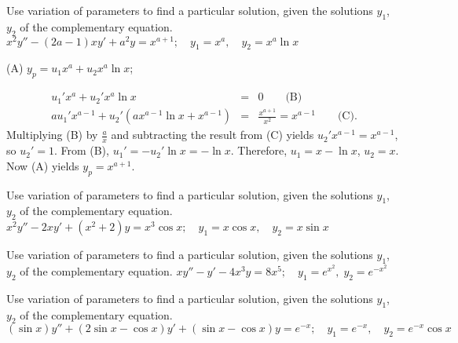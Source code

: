 \documentclass{ximera}
\begin{document}
\begin{problem}\label{exer:5.7.16}
Use variation
of parameters to find a particular solution, given the solutions
$y_1$, $y_2$ of the complementary equation. $x^2y''-(2a-1)xy'+a^2y=x^{a+1}; \quad  y_1=x^a,
\quad y_2=x^a \ln x$

\begin{solution}
(A) $y_p=u_1x^a+u_2x^a\ln x$;

\begin{eqnarray*}
u_1'x^a+u_2'x^a\ln x&=&0\qquad\text{(B)}\\ %
au_1'x^{a-1}+u_2'(ax^{a-1}\ln x+x^{a-1})&=&\frac{x^{a+1}}{x^2}=x^{a-1}\qquad\text{(C)}. %
\end{eqnarray*}
Multiplying (B) by $\frac{a}{x}$ and subtracting
the result from (C) yields $u_2'x^{a-1}=x^{a-1}$, so
$u_2'=1$. From (B), $u_1'=-u_2'\ln x=-\ln x$.
Therefore, $u_1=x-\ln x$, $u_2=x$. Now (A) yields $y_p=x^{a+1}$.
\end{solution}
\end{problem}

\begin{problem}\label{exer:5.7.17}
Use variation
of parameters to find a particular solution, given the solutions
$y_1$, $y_2$ of the complementary equation. $x^2y''-2xy'+(x^2+2)y=x^3\cos x; \quad  y_1=x\cos x,
\quad y_2=x\sin x$
\end{problem}

\begin{problem}\label{exer:5.7.18}
Use variation
of parameters to find a particular solution, given the solutions
$y_1$, $y_2$ of the complementary equation. $xy''-y'-4x^3y=8x^5;\quad  y_1=e^{x^2},\;  y_2=e^{-x^2}$
\end{problem}

\begin{problem}\label{exer:5.7.19}
Use variation
of parameters to find a particular solution, given the solutions
$y_1$, $y_2$ of the complementary equation. $(\sin x)y''+(2\sin x-\cos x)y'+(\sin x-\cos x)y=e^{-x}; \quad
y_1=e^{-x},\quad y_2=e^{-x}\cos x$
\end{problem}
\end{document}
